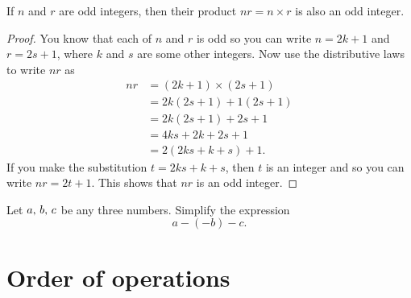 \documentclass[a4paper,oneside,12pt]{article}
\begin{document}
\begin{theorem}
If $n$ and $r$ are odd integers, then their product $nr = n \times r$
is also an odd integer.
\end{theorem}

\begin{proof}
You know that each of $n$ and $r$ is odd so you can write
$n = 2k + 1$ and $r = 2s + 1$, where $k$ and $s$ are some other
integers.  Now use the distributive laws to write $nr$ as
\begin{align*}
nr
&=
(2k + 1) \times (2s + 1) \\[4pt]
&=
2k(2s + 1) + 1(2s + 1) \\[4pt]
&=
2k(2s + 1) + 2s + 1 \\[4pt]
&=
4ks + 2k + 2s + 1 \\[4pt]
&=
2(2ks + k + s) + 1.
\end{align*}
If you make the substitution $t = 2ks + k + s$, then $t$ is an integer
and so you can write $nr = 2t + 1$.  This shows that $nr$ is an odd
integer.
\end{proof}

\begin{exercise}
Let ${a},\, {b},\, {c}$ be any three numbers.  Simplify the expression
\[
a - (-b) - c.
\]
\end{exercise}




\section{Order of operations}
\end{document}
